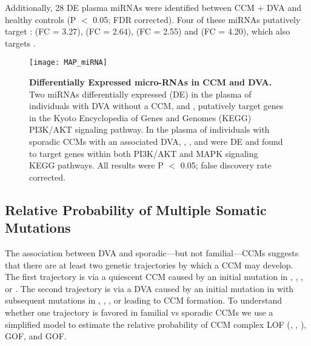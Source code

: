 Additionally, 28 DE plasma miRNAs were identified between CCM + DVA and healthy controls (P $<$ 0.05; FDR corrected). Four of these miRNAs putatively target :  (FC = 3.27),  (FC = 2.64),  (FC = 2.55) and  (FC = 4.20), which also targets . 

\begin{figure}[t!]
\centering
\texttt{[image: MAP\_miRNA]}
\caption[Differentially Expressed micro-RNAs in CCM and DVA]{\textbf{Differentially Expressed micro-RNAs in CCM and DVA. \\} 
Two miRNAs differentially expressed (DE) in the plasma of individuals with DVA without a CCM,  and , putatively target genes in the Kyoto Encyclopedia of Genes and Genomes (KEGG) PI3K/AKT signaling pathway. In the plasma of individuals with sporadic CCMs with an associated DVA, , , and  were DE and found to target genes within both PI3K/AKT and MAPK signaling KEGG pathways. All results were P $<$ 0.05; false discovery rate corrected. }

\label{MAP_miRNA}
\end{figure}


\subsection{Relative Probability of Multiple Somatic Mutations }

The association between DVA and sporadic---but not familial---CCMs suggests that there are at least two genetic trajectories by which a CCM may develop. The first trajectory is via a quiescent CCM caused by an initial mutation in , , , or . The second trajectory is via a DVA caused by an initial mutation in  with subsequent mutations in , , , or  leading to CCM formation. To understand whether one trajectory is favored in familial vs sporadic CCMs we use a simplified model to estimate the relative probability of CCM complex LOF (, , ),  GOF, and  GOF. 

